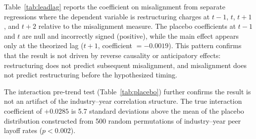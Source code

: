 Table~\ref{tab:leadlag} reports the coefficient on misalignment from
separate regressions where the dependent variable is restructuring
charges at $t-1$, $t$, $t+1$, and $t+2$ relative to the misalignment
measure. The placebo coefficients at $t-1$ and $t$ are null and
incorrectly signed (positive), while the main effect appears only at
the theorized lag ($t+1$, coefficient $= -0.0019$). This pattern
confirms that the result is not driven by reverse causality or
anticipatory effects: restructuring does not predict subsequent
misalignment, and misalignment does not predict restructuring before
the hypothesized timing.

The interaction pre-trend test (Table~\ref{tab:placebo}) further
confirms the result is not an artifact of the industry--year correlation
structure. The true interaction coefficient of $+0.0285$ is 5.7
standard deviations above the mean of the placebo distribution
constructed from 500 random permutations of industry--year peer
layoff rates ($p < 0.002$).

